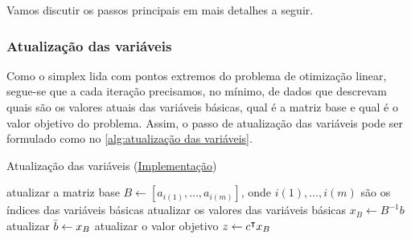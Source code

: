 \begin{algorithm}
\end{algorithm}

Vamos discutir os passos principais em mais detalhes a seguir.

\subsubsection*{Atualização das variáveis}
Como o simplex lida com pontos extremos do problema de otimização linear, segue-se que a cada iteração precisamos, no mínimo, de dados que descrevam quais são os valores atuais das variáveis básicas, qual é a matriz base e qual é o valor objetivo do problema. Assim, o passo de atualização das variáveis pode ser formulado como no \cref{alg:atualização das variáveis}.

\begin{algorithm}
\begin{algorithmic}[1]
    \caption{Atualização das variáveis (\href{https://github.com/phcentenaro7/Caique.jl/blob/9c78027f1884181846a6321a5640f92c9a718ce4/src/Simplex.jl\#L80}{Implementação})}\label{alg:atualização das variáveis}
    \State atualizar a matriz base $ B \gets [a_{i(1)}, \ldots, a_{i(m)}]$, onde $i(1), \ldots, i(m)$ são os índices das variáveis básicas
    \State atualizar os valores das variáveis básicas $  x_B \gets B^{-1}b$
    \State atualizar $\bar{b} \gets   x_B$
    \State atualizar o valor objetivo $z \gets c^\intercal  x_B$
\end{algorithmic}
\end{algorithm}

